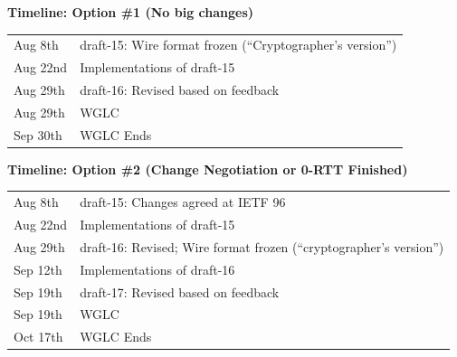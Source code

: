 \documentclass[helvetica]{seminar}
\newcommand{\heading}[1]{%
  \begin{center} 
    \large\bf 
    #1 
  \end{center} 
  \vspace{.4 in}}
\begin{document}
\begin{slide}
\heading{Timeline: Option \#1 (No big changes)}

\begin{tabular}{l l}
Aug 8th & draft-15: Wire format frozen (``Cryptographer's version'') \\
Aug 22nd & Implementations of draft-15 \\
Aug 29th & draft-16: Revised based on feedback \\
Aug 29th & WGLC \\
Sep 30th & WGLC Ends \\
\end{tabular}

\end{slide}


\begin{slide}
\heading{Timeline: Option \#2 (Change Negotiation or 0-RTT Finished)}

\begin{tabular}{l l}
Aug 8th & draft-15: Changes agreed at IETF 96 \\
Aug 22nd & Implementations of draft-15 \\
Aug 29th & draft-16: Revised; Wire format frozen (``cryptographer's version'')\\
Sep 12th & Implementations of draft-16 \\
Sep 19th & draft-17: Revised based on feedback \\
Sep 19th & WGLC \\
Oct 17th & WGLC Ends \\
\end{tabular}

\end{slide}
\end{document}
